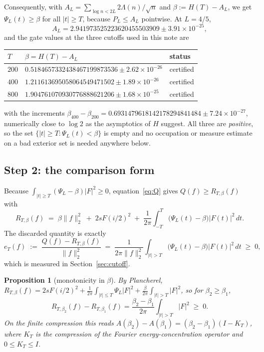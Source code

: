 \documentclass[11pt,a4paper]{article}
\newtheorem{proposition}[theorem]{Proposition}
\theoremstyle{definition}
\theoremstyle{remark}
\newcommand{\PsiL}{\Psi_{L}}
\begin{document}
Consequently, with $A_L = \sum_{\log n < 2L} 2\Lambda(n)/\sqrt n$ and
$\beta := H(T) - A_L$, we get $\PsiL(t) \ge \beta$ for all $|t| \ge T$, because
$P_L \le A_L$ pointwise. At $L = 4/5$,
\[
   A_L = 2.941973525223620455503909 \pm 3.91\times10^{-25},
\]
and the gate values at the three cutoffs used in this note are
\begin{center}
\begin{tabular}{lll}
\toprule
$T$ & $\beta = H(T) - A_L$ & status \\
\midrule
$200$ & $0.5184657332438467199873536 \pm 2.62\times10^{-26}$ & certified \\
$400$ & $1.211613695058064549471502 \pm 1.89\times10^{-26}$ & certified \\
$800$ & $1.904761070930776888621206 \pm 1.68\times10^{-25}$ & certified \\
\bottomrule
\end{tabular}
\end{center}
with the increments $\beta_{400} - \beta_{200} = 0.6931479618142178294841484 \pm
7.24\times10^{-27}$, numerically close to $\log 2$ as the asymptotics of $H$
suggest. All three are \emph{positive}, so the set
$\{|t| \ge T : \PsiL(t) < \beta\}$ is empty and no occupation or measure
estimate on a bad exterior set is needed anywhere below.

\subsection{Step 2: the comparison form}

Because $\int_{|t| \ge T} (\PsiL - \beta)|F|^2 \ge 0$, equation~\eqref{eq:Q}
gives $Q(f) \ge R_{T,\beta}(f)$ with
\begin{equation}
\label{eq:R}
   R_{T,\beta}(f) \;=\; \beta \|f\|_2^2 \;+\; 2 s F(i/2)^2
     \;+\; \frac{1}{2\pi}\int_{-T}^{T} \big(\PsiL(t) - \beta\big) |F(t)|^2\, dt .
\end{equation}
The discarded quantity is exactly
\begin{equation}
\label{eq:e}
   e_T(f) \;:=\; \frac{Q(f) - R_{T,\beta}(f)}{\|f\|_2^2}
   \;=\; \frac{1}{2\pi\|f\|_2^2}\int_{|t| > T} \big(\PsiL(t) - \beta\big)|F(t)|^2\, dt
   \;\ge\; 0 ,
\end{equation}
which is measured in Section~\ref{sec:cutoff}.

\begin{proposition}[monotonicity in $\beta$]
\label{prop:beta}
By Plancherel, $R_{T,\beta}(f) = 2sF(i/2)^2 + \frac{1}{2\pi}\int_{|t|\le T}
\PsiL |F|^2 + \frac{\beta}{2\pi}\int_{|t| > T}|F|^2$, so for
$\beta_2 \ge \beta_1$,
\[
   R_{T,\beta_2}(f) - R_{T,\beta_1}(f)
   = \frac{\beta_2-\beta_1}{2\pi}\int_{|t|>T}|F|^2 \;\ge\; 0 .
\]
On the finite compression this reads $A(\beta_2) - A(\beta_1) =
(\beta_2-\beta_1)(I - K_T)$, where $K_T$ is the compression of the Fourier
energy-concentration operator and $0 \le K_T \le I$.
\end{proposition}
\end{document}
